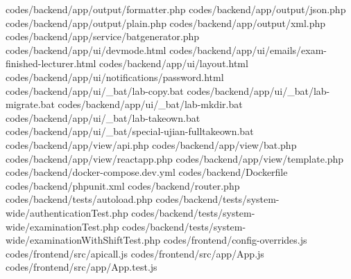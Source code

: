 codes/backend/app/output/formatter.php
codes/backend/app/output/json.php
codes/backend/app/output/plain.php
codes/backend/app/output/xml.php
codes/backend/app/service/batgenerator.php
codes/backend/app/ui/devmode.html
codes/backend/app/ui/emails/exam-finished-lecturer.html
codes/backend/app/ui/layout.html
codes/backend/app/ui/notifications/password.html
codes/backend/app/ui/_bat/lab-copy.bat
codes/backend/app/ui/_bat/lab-migrate.bat
codes/backend/app/ui/_bat/lab-mkdir.bat
codes/backend/app/ui/_bat/lab-takeown.bat
codes/backend/app/ui/_bat/special-ujian-fulltakeown.bat
codes/backend/app/view/api.php
codes/backend/app/view/bat.php
codes/backend/app/view/reactapp.php
codes/backend/app/view/template.php
codes/backend/docker-compose.dev.yml
codes/backend/Dockerfile
codes/backend/phpunit.xml
codes/backend/router.php
codes/backend/tests/autoload.php
codes/backend/tests/system-wide/authenticationTest.php
codes/backend/tests/system-wide/examinationTest.php
codes/backend/tests/system-wide/examinationWithShiftTest.php
codes/frontend/config-overrides.js
codes/frontend/src/apicall.js
codes/frontend/src/app/App.js
codes/frontend/src/app/App.test.js
